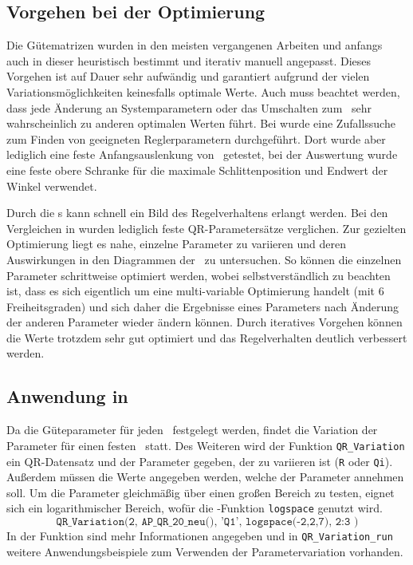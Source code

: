 \subsection{Vorgehen bei der Optimierung}

Die Gütematrizen wurden in den meisten vergangenen Arbeiten und anfangs auch in dieser heuristisch bestimmt und iterativ manuell angepasst.
Dieses Vorgehen ist auf Dauer sehr aufwändig und garantiert aufgrund der vielen Variationsmöglichkeiten keinesfalls optimale Werte.
Auch muss beachtet werden, dass jede Änderung an Systemparametern oder das Umschalten zum \beob\ sehr wahrscheinlich zu anderen optimalen Werten führt.
Bei \cite{chang} wurde eine Zufallssuche zum Finden von geeigneten Reglerparametern durchgeführt.
Dort wurde aber lediglich eine feste Anfangsauslenkung von \phz\ getestet, bei der Auswertung wurde eine feste obere Schranke für die maximale Schlittenposition und Endwert der Winkel verwendet.

Durch die \xots s  kann schnell ein Bild des Regelverhaltens erlangt werden.
Bei den Vergleichen in  wurden lediglich feste QR-Parametersätze verglichen.
Zur gezielten Optimierung liegt es nahe, einzelne Parameter zu variieren und deren Auswirkungen in den Diagrammen der \xots\ zu untersuchen.
So können die einzelnen Parameter schrittweise optimiert werden, wobei selbstverständlich zu beachten ist, dass es sich eigentlich um eine multi-variable Optimierung handelt (mit 6 Freiheitsgraden) und sich daher die Ergebnisse eines Parameters nach Änderung der anderen Parameter wieder ändern können.
Durch iteratives Vorgehen können die Werte trotzdem sehr gut optimiert und das Regelverhalten deutlich verbessert werden.


\subsection{Anwendung in \ml}

Da die Güteparameter für jeden \ap\ festgelegt werden, findet die Variation der Parameter für einen festen \ap\ statt.
Des Weiteren wird der Funktion \texttt{QR\_Variation} ein QR-Datensatz und der Parameter gegeben, der zu variieren ist (\texttt{R} oder \texttt{Qi}).
Außerdem müssen die Werte angegeben werden, welche der Parameter annehmen soll.
Um die Parameter gleichmäßig über einen großen Bereich zu testen, eignet sich ein logarithmischer Bereich, wofür die \ml-Funktion \texttt{logspace} genutzt wird.
	\[
	\texttt{QR\_Variation(2, AP\_QR\_20\_neu(), 'Q1', logspace(-2,2,7), 2:3 )}
\]
In der Funktion sind mehr Informationen angegeben und in \texttt{QR\_Variation\_run} weitere Anwendungsbeispiele zum Verwenden der Parametervariation vorhanden.

